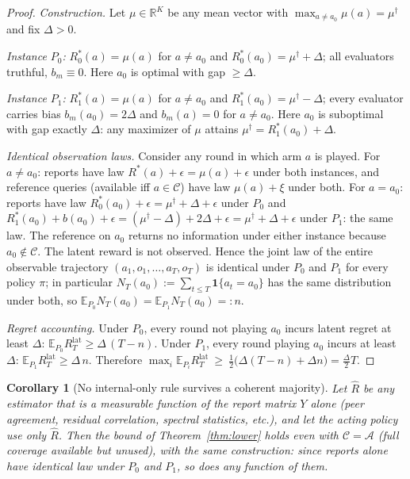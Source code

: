 \documentclass[11pt]{article}
\newtheorem{corollary}{Corollary}
\theoremstyle{definition}\newtheorem{definition}{Definition}
\theoremstyle{definition}\newtheorem{assumption}{Assumption}
\newcommand{\Rstar}{R^{\ast}}\newcommand{\astar}{a^{\ast}}
\newcommand{\A}{\mathcal{A}}\newcommand{\Cov}{\mathcal{C}}
\newcommand{\E}{\mathbb{E}}\newcommand{\Prob}{\mathbb{P}}
\begin{document}
\begin{proof}
\emph{Construction.} Let $\mu\in\mathbb{R}^{K}$ be any mean vector with
$\max_{a\neq a_0}\mu(a)=\mu^{\dagger}$ and fix $\Delta>0$.

\emph{Instance $P_0$:} $\Rstar_0(a)=\mu(a)$ for $a\neq a_0$ and
$\Rstar_0(a_0)=\mu^{\dagger}+\Delta$; all evaluators truthful, $b_m\equiv 0$.
Here $a_0$ is optimal with gap $\ge\Delta$.

\emph{Instance $P_1$:} $\Rstar_1(a)=\mu(a)$ for $a\neq a_0$ and
$\Rstar_1(a_0)=\mu^{\dagger}-\Delta$; every evaluator carries bias
$b_m(a_0)=2\Delta$ and $b_m(a)=0$ for $a\neq a_0$.
Here $a_0$ is suboptimal with gap exactly $\Delta$: any maximizer of $\mu$
attains $\mu^{\dagger}=\Rstar_1(a_0)+\Delta$.

\emph{Identical observation laws.} Consider any round in which arm $a$ is played.
For $a\neq a_0$: reports have law $\Rstar(a)+\epsilon=\mu(a)+\epsilon$ under both
instances, and reference queries (available iff $a\in\Cov$) have law $\mu(a)+\xi$
under both. For $a=a_0$: reports have law
$\Rstar_0(a_0)+\epsilon=\mu^{\dagger}+\Delta+\epsilon$ under $P_0$ and
$\Rstar_1(a_0)+b(a_0)+\epsilon=(\mu^{\dagger}-\Delta)+2\Delta+\epsilon
=\mu^{\dagger}+\Delta+\epsilon$ under $P_1$: the same law. The reference on $a_0$
returns no information under either instance because $a_0\notin\Cov$. The latent
reward is not observed. Hence the joint law of the entire observable trajectory
$(a_1,o_1,\dots,a_T,o_T)$ is identical under $P_0$ and $P_1$ for every policy
$\pi$; in particular $N_T(a_0):=\sum_{t\le T}\mathbf 1\{a_t=a_0\}$ has the same
distribution under both, so $\E_{P_0}N_T(a_0)=\E_{P_1}N_T(a_0)=:n$.

\emph{Regret accounting.} Under $P_0$, every round not playing $a_0$ incurs
latent regret at least $\Delta$:
$\E_{P_0}R_T^{\mathrm{lat}}\ge \Delta\,(T-n)$.
Under $P_1$, every round playing $a_0$ incurs at least $\Delta$:
$\E_{P_1}R_T^{\mathrm{lat}}\ge \Delta\,n$.
Therefore
$\max_i \E_{P_i}R_T^{\mathrm{lat}}\ \ge\ \tfrac12\big(\Delta(T-n)+\Delta n\big)
=\tfrac{\Delta}{2}T$.
\end{proof}

\begin{corollary}[No internal-only rule survives a coherent majority]
\label{cor:internal}
Let $\hat R$ be any estimator that is a measurable function of the report matrix
$Y$ alone (peer agreement, residual correlation, spectral statistics, etc.), and
let the acting policy use only $\hat R$. Then the bound of
Theorem~\ref{thm:lower} holds even with $\Cov=\A$ (full coverage available but
unused), with the same construction: since reports alone have identical law under
$P_0$ and $P_1$, so does any function of them.
\end{corollary}
\end{document}
